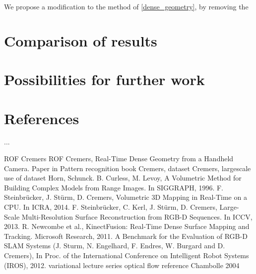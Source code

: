 \documentclass[conference]{IEEEtran}
\begin{document}
We propose a modification to the method of \ref{dense_geometry}, by removing the 









\section{Comparison of results}
\section{Possibilities for further work}

\section*{References}
...

\begin{thebibliography}{00}
    ROF
    Cremers ROF
    Cremers, Real-Time Dense Geometry from a Handheld Camera.
    Paper in Pattern recognition book
    Cremers, dataset
    Cremers, largescale use of dataset
    Horn, Schunck.
    B. Curless, M. Levoy, A Volumetric Method for Building Complex Models from Range Images. In SIGGRAPH, 1996.
    F. Steinbr\"ucker, J. St\"urm, D. Cremers, Volumetric 3D Mapping in Real-Time on a CPU. In ICRA, 2014.
    F. Steinbr\"ucker, C. Kerl, J. St\"urm, D. Cremers, Large-Scale Multi-Resolution Surface Reconstruction from RGB-D Sequences. In ICCV, 2013.
    R. Newcombe et al., KinectFusion: Real-Time Dense Surface Mapping and Tracking. Microsoft Research, 2011.
    A Benchmark for the Evaluation of RGB-D SLAM Systems (J. Sturm, N. Engelhard, F. Endres, W. Burgard and D. Cremers), In Proc. of the International Conference on Intelligent Robot Systems (IROS), 2012. 
    variational lecture series
    optical flow reference
    Chambolle 2004
\end{thebibliography}
\end{document}
